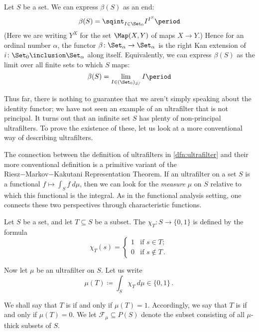 \begin{nul}
	Let $ S $ be a set.
	We can express $ \beta(S) $ as an end:
	\[
		\beta(S) =
		\sqint_{I \in \Set_0} I^{I^S} \period
	\]
	(Here we are writing $ Y^X $ for the set $ \Map(X,Y) $
	of maps $ X \to Y $.)
	Hence for an ordinal number $ \alpha $,
	the functor $ \beta \colon \Set_{\alpha} \to \Set_{\alpha} $
	is the right Kan extension of
	$ i \colon \Set_0 \inclusion \Set_{\alpha} $
	along itself.
	Equivalently, we can express $ \beta(S) $
	as the limit over all finite sets
	to which $ S $ maps:
	\[ \beta(S) = \lim_{I \in (\Set_0)_{S/}} I \period \]
\end{nul}

Thus far, there is nothing to guarantee that we aren't
simply speaking about the identity functor;
we have not seen an example of an ultrafilter
that is not principal.
It turns out that an infinite set $ S $ has plenty of
non-principal ultrafilters.
To prove the existence of these,
let us look at a more conventional way
of describing ultrafilters.

The connection between
the definition of ultrafilters in \ref{dfn:ultrafilter} and
their more conventional definition
is a primitive variant of
the Riesz−Markov−Kakutani Representation Theorem.
If an ultrafilter on a set $ S $ is
a functional $ f \mapsto \int_S f \ d \mu $,
then we can look for the \emph{measure} $ \mu $ on $ S $
relative to which this functional is the integral.
As in the functional analysis setting,
one connects these two perspectives through
characteristic functions.

\begin{definition}
	Let $ S $ be a set, and
	let $ T \subseteq S$ be a subset.
	The 
	$ \chi_T \colon S \to \{ 0,1 \}$
	is defined by the formula
	\[
		\chi_T(s) =
		\begin{cases}
			1 & \text{if } s \in T \semicolon \\
			0 & \text{if } s \notin T \period
		\end{cases}
	\]
	
	Now let $ \mu $ be an ultrafilter on $ S $.
	Let us write
	\[
		\mu(T) \coloneq
		\int_S \chi_T \ d \mu \in
		\{ 0,1 \} \period
	\]
	
	We shall say that $ T $ is 
	if and only if $\mu(T) = 1$.
	Accordingly, we say that $ T $ is 
	if and only if $ \mu(T) = 0 $.
	We let $ \mathscr{F}_{\mu} \subseteq P(S) $ denote
	the subset consisting of all $ \mu $-thick subsets of $ S $.
\end{definition}


